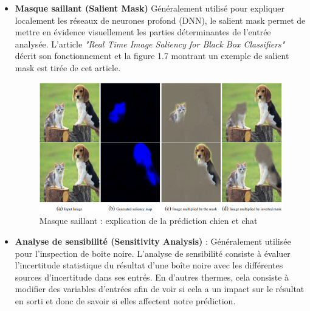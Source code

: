 \begin{itemize}
    \item \textbf{Masque saillant (Salient Mask)} Généralement utilisé pour expliquer localement les réseaux de neurones profond (DNN), le salient mask permet de mettre en évidence visuellement les parties déterminantes de l'entrée analysée. L'article \textit{"Real Time Image Saliency for Black Box Classifiers"}\cite{silentMask} décrit son fonctionnement et la figure 1.7 montrant un exemple de salient mask est tirée de cet article.
    \begin{figure}[h]
        \centering
        \includegraphics[scale=0.85]{src_img/silentMaskExemple.PNG}
        \caption{Masque saillant : explication de la prédiction chien et chat}
        \label{silentMaskExemple}
    \end{figure}
    
    \item \textbf{Analyse de sensibilité (Sensitivity Analysis)} : Généralement utilisée pour l'inspection de boite noire. L'analyse de sensibilité consiste à évaluer l’incertitude statistique du résultat d’une boîte noire avec les différentes sources d’incertitude dans ses entrés. En d'autres thermes, cela consiste à modifier des variables d'entrées afin de voir si cela a un impact sur le résultat en sorti et donc de savoir si elles affectent notre prédiction.
    

\end{itemize}
